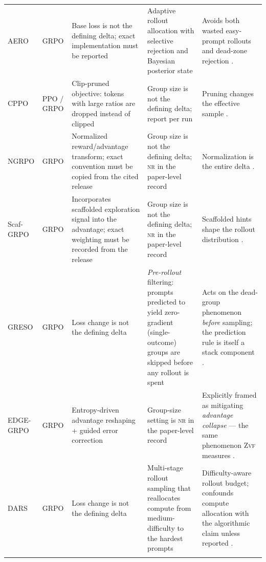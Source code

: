 \documentclass[11pt]{article}
\newcommand{\nr}{\textsc{nr}}
\newcommand{\zvf}{\textsc{Zvf}}
\newcommand{\grpo}{\textsc{GRPO}}
\begin{document}
\begin{longtable}{@{}p{2.1cm}p{2.4cm}p{3.0cm}p{2.0cm}p{3.3cm}@{}}
AERO & \grpo{} & Base loss is not the defining delta; exact implementation
  must be reported & Adaptive rollout allocation with selective rejection and
  Bayesian posterior state & Avoids both wasted easy-prompt rollouts and
  dead-zone rejection \cite{zhang2026aero}.\\
\addlinespace

CPPO & PPO / \grpo{} & Clip-pruned objective: tokens with large ratios are
  dropped instead of clipped & Group size is not the defining delta; report per
  run & Pruning changes the
  effective sample \cite{lin2025cppo}.\\
\addlinespace

NGRPO & \grpo{} & Normalized reward/advantage transform; exact convention must
  be copied from the cited release & Group size is not the defining delta; \nr{}
  in the paper-level record & Normalization is the entire delta
  \cite{nan2025ngrpo}.\\
\addlinespace

Scaf-\grpo{} & \grpo{} & Incorporates scaffolded exploration signal into the
  advantage; exact weighting must be recorded from the release & Group size is
  not the defining delta; \nr{} in the paper-level record & Scaffolded hints shape
  the rollout distribution \cite{zhang2025scaffgrpo}.\\
\addlinespace

GRESO & \grpo{} & Loss change is not the defining delta & \emph{Pre-rollout} filtering:
  prompts predicted to yield zero-gradient (single-outcome) groups are skipped
  before any rollout is spent & Acts on the dead-group phenomenon \emph{before}
  sampling; the prediction rule is itself a stack component
  \cite{greso2025,agenticrlsurvey2026}.\\
\addlinespace

EDGE-\grpo{} & \grpo{} & Entropy-driven advantage reshaping + guided error
  correction & Group-size setting is \nr{} in the paper-level record & Explicitly framed as mitigating
  \emph{advantage collapse} --- the same phenomenon \zvf{} measures
  \cite{edgegrpo2025,agenticrlsurvey2026}.\\
\addlinespace

DARS & \grpo{} & Loss change is not the defining delta & Multi-stage rollout sampling that
  reallocates compute from medium-difficulty to the hardest prompts &
  Difficulty-aware rollout budget; confounds compute allocation with the
  algorithmic claim unless reported \cite{dars2025,agenticrlsurvey2026}.\\
\addlinespace


\end{longtable}
\end{document}
